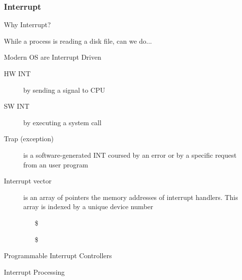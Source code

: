 \subsubsection{Interrupt}
\label{sec:interrupt}

\begin{frame}{Why Interrupt?}
  \begin{block}{While a process is reading a disk file, can we do...}
    \begin{center}
    \end{center}
  \end{block}
\end{frame}

\begin{frame}{Modern OS are Interrupt Driven}
  \begin{description}
  \item[HW INT] by sending a signal to CPU
  \item[SW INT] by executing a \alert{system call}
  \item[Trap (exception)] is a software-generated INT coursed by an error or by a
    specific request from an user program
  \item[Interrupt vector] is an array of pointers {\pright} the memory addresses
    of \alert{interrupt handlers}. This array is indexed by a unique device number
    \begin{itemize}
    \item[\$] 
    \item[\$] 
    \end{itemize}
  \end{description}
\end{frame}

\begin{frame}{Programmable Interrupt Controllers}
  \begin{center}
  \end{center}
\end{frame}

\begin{frame}{Interrupt Processing}
  \begin{center}
  \end{center}
\end{frame}

